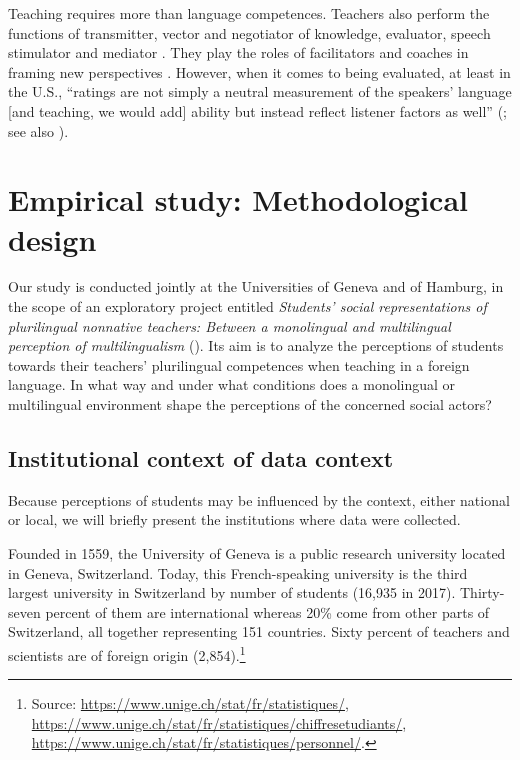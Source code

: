 \documentclass[output=paper]{../langscibook}
\begin{document}
Teaching requires more than language competences. Teachers also perform the functions of transmitter, vector and negotiator of knowledge, evaluator, speech stimulator and mediator \citep{Gajo2005}. They play the roles of facilitators and coaches in framing new perspectives \citep{RoussiCherkaoui2011}. However, when it comes to being evaluated, at least in the U.S., “ratings are not simply a neutral measurement of the speakers’ language [and teaching, we would add] ability but instead reflect listener factors as well” (\citealt[700]{KangEtAl2015}; see also \citealt{LindemannSubtirelu2013}).

\section{Empirical study: Methodological design}

Our study is conducted jointly at the Universities of Geneva and of Hamburg, in the scope of an exploratory project entitled \emph{Students’ social representations of plurilingual nonnative teachers: Between a monolingual and multilingual perception of multilingualism} (\citealt{YanaprasartMelo-Pfeifer2017,YanaprasartMelo-Pfeifer2019}). Its aim is to analyze the perceptions of students towards their teachers’ plurilingual competences when teaching in a foreign language. In what way and under what conditions does a monolingual or multilingual environment shape the perceptions of the concerned social actors?

\subsection{Institutional context of data context}

Because perceptions of students may be influenced by the context, either national or local, we will briefly present the institutions where data were collected. 

Founded in 1559, the University of Geneva is a public research university located in Geneva, Switzerland. Today, this French-speaking university is the third largest university in Switzerland by number of students (16,935 in 2017). Thirty-seven percent of them are international whereas 20\% come from other parts of Switzerland, all together representing 151 countries. Sixty percent of teachers and scientists are of foreign origin (2,854).\footnote{Source: \url{https://www.unige.ch/stat/fr/statistiques/}, \url{https://www.unige.ch/stat/fr/statistiques/chiffresetudiants/}, \url{https://www.unige.ch/stat/fr/statistiques/personnel/}.}
\end{document}

